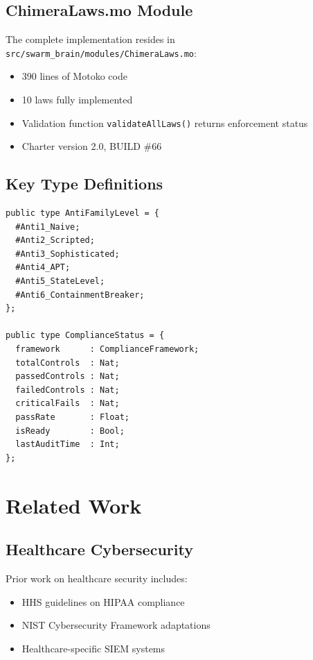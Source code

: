 \documentclass[12pt]{article}
\begin{document}
\subsection{ChimeraLaws.mo Module}

The complete implementation resides in \texttt{src/swarm\_brain/modules/ChimeraLaws.mo}:

\begin{itemize}[nosep]
  \item 390 lines of Motoko code
  \item 10 laws fully implemented
  \item Validation function \texttt{validateAllLaws()} returns enforcement status
  \item Charter version 2.0, BUILD \#66
\end{itemize}

\subsection{Key Type Definitions}

\begin{verbatim}
public type AntiFamilyLevel = {
  #Anti1_Naive;
  #Anti2_Scripted;
  #Anti3_Sophisticated;
  #Anti4_APT;
  #Anti5_StateLevel;
  #Anti6_ContainmentBreaker;
};

public type ComplianceStatus = {
  framework      : ComplianceFramework;
  totalControls  : Nat;
  passedControls : Nat;
  failedControls : Nat;
  criticalFails  : Nat;
  passRate       : Float;
  isReady        : Bool;
  lastAuditTime  : Int;
};
\end{verbatim}

\section{Related Work}
\label{sec:related}

\subsection{Healthcare Cybersecurity}

Prior work on healthcare security includes:
\begin{itemize}[nosep]
  \item HHS guidelines on HIPAA compliance~\cite{HHS2024}
  \item NIST Cybersecurity Framework adaptations~\cite{NIST2018}
  \item Healthcare-specific SIEM systems~\cite{Splunk2023}
\end{itemize}
\end{document}
